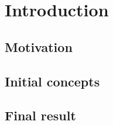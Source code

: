 \section{Introduction}
\cite{dirac}

\subsection{Motivation}

\subsection{Initial concepts}

\subsection{Final result}

